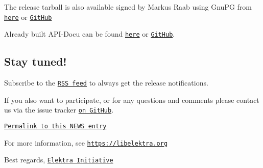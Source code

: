 The release tarball is also available signed by Markus Raab using Gnu\+PG from \href{https://www.libelektra.org/ftp/elektra/releases/elektra-0.8.25.tar.gz.gpg}{\tt here} or \href{https://github.com/ElektraInitiative/ftp/blob/master/releases//elektra-0.8.25.tar.gz.gpg?raw=true}{\tt Git\+Hub}

Already built A\+P\+I-\/\+Docu can be found \href{https://doc.libelektra.org/api/0.8.25/html/}{\tt here} or \href{https://github.com/ElektraInitiative/doc/tree/master/api/0.8.25}{\tt Git\+Hub}.

\subsection*{Stay tuned!}

Subscribe to the \href{https://www.libelektra.org/news/feed.rss}{\tt R\+SS feed} to always get the release notifications.

If you also want to participate, or for any questions and comments please contact us via the issue tracker \href{http://issues.libelektra.org}{\tt on Git\+Hub}.

\href{https://www.libelektra.org/news/0.8.25-release}{\tt Permalink to this N\+E\+WS entry}

For more information, see \href{https://libelektra.org}{\tt https\+://libelektra.\+org}

Best regards, \href{https://www.libelektra.org/developers/authors}{\tt Elektra Initiative} 